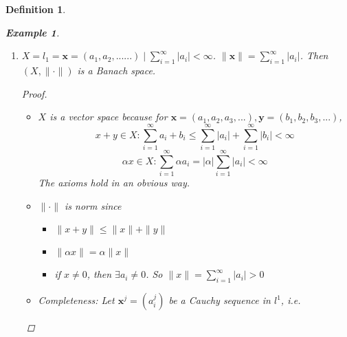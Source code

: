 \documentclass{article}
\newtheorem*{definition}{Definition}
\newtheorem*{remark}{Remark}
\newtheorem*{example}{Example}
\begin{document}
\begin{definition}
\begin{example}
\begin{enumerate}
\[            \] 
            $f_n$ is actually a Cauchy sequence in $(X, d_1)$, since \\
            $d_1(f_n, f_m) \le d_1(f_n, f_0) + d_1(f_0, f_m) \le \frac{1}{2n} + \frac{1}{2m}$.
            Conclusion: $(C([0, 1]), d_1)$ is NOT complete.
            \begin{remark}
                $C([0, 1]) \subset L^1([0, 1])$ and we will see $(L^1, d_1)$ is complete.
            \end{remark}
            In general, for any incomplete metric space $(X, d)$, it is possible to construct a complete metric space
            $(\overline{X}, \overline{d})$ so that $X$ is dense(we will define this next time) in $\overline{X}$ and
            $\overline{d}|_X = d$.
            The procedure is the same as $\mathbb{Q} \rightarrow \mathbb{R}$.
            See HW next time.
            \item $X = l_1 = {\mathbf{x}=(a_1, a_2, ......)\mid\sum_{i=1}^{\infty}{|a_i| < \infty}}$.
            $\|\mathbf{x}\| = \sum_{i=1}^{\infty}{|a_i|}$. Then $(X, \|\cdot\|)$ is a Banach space.
            \begin{proof} \hfill
                \begin{itemize}
                    \item $X$ is a vector space because for 
                    $\mathbf{x}=(a_1, a_2, a_3, ...), \mathbf{y}=(b_1, b_2, b_3, ...)$,
                    \[
                    x + y \in X: \sum_{i=1}^{\infty}{a_i + b_i} \le \sum_{i=1}^{\infty}{|a_i|} + \sum_{i=1}^{\infty}{|b_i|} < \infty
                    \]
                    \[
                    \alpha x \in X: \sum_{i=1}^{\infty}{\alpha a_i} = |\alpha|\sum_{i=1}^{\infty}{|a_i| < \infty}
                    \]
                    The axioms hold in an obvious way.
                    \item $\|\cdot\|$ is norm since
                    \begin{itemize}
                        \item $\|x + y\| \le \|x\| + \|y\|$
                        \item $\|\alpha x\| = \alpha \|x\|$
                        \item if $x \ne 0$, then $\exists a_i \ne 0$. So $\|x\| = \sum_{i=1}^{\infty}{|a_i|} > 0$
                    \end{itemize}
                    \item Completeness:
                    Let $\mathbf{x}^j = (a_i^j)$ be a Cauchy sequence in $l^1$, i.e.

\end{itemize}
\end{proof}
\end{enumerate}
\end{example}
\end{definition}
\end{document}
